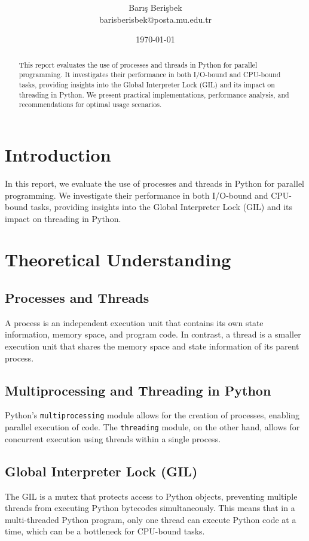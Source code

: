 \documentclass[onecolumn]{article}
\title{\spacecaps{Assignment Report :Evaluating the Optimal Use of Processes versus Threads in Python Parallel Programming}\\ \normalsize \spacesc{CENG 2034, Operating Systems} }
\author{Barış Berişbek\\barisberisbek@posta.mu.edu.tr}
\date{\today}
\begin{document}
\maketitle

\begin{abstract}
This report evaluates the use of processes and threads in Python for parallel programming. It investigates their performance in both I/O-bound and CPU-bound tasks, providing insights into the Global Interpreter Lock (GIL) and its impact on threading in Python. We present practical implementations, performance analysis, and recommendations for optimal usage scenarios.
\end{abstract}

\section{Introduction}
In this report, we evaluate the use of processes and threads in Python for parallel programming. We investigate their performance in both I/O-bound and CPU-bound tasks, providing insights into the Global Interpreter Lock (GIL) and its impact on threading in Python.

\section{Theoretical Understanding}
\subsection{Processes and Threads}
A process is an independent execution unit that contains its own state information, memory space, and program code. In contrast, a thread is a smaller execution unit that shares the memory space and state information of its parent process.

\subsection{Multiprocessing and Threading in Python}
Python's \texttt{multiprocessing} module allows for the creation of processes, enabling parallel execution of code. The \texttt{threading} module, on the other hand, allows for concurrent execution using threads within a single process.

\subsection{Global Interpreter Lock (GIL)}
The GIL is a mutex that protects access to Python objects, preventing multiple threads from executing Python bytecodes simultaneously. This means that in a multi-threaded Python program, only one thread can execute Python code at a time, which can be a bottleneck for CPU-bound tasks.
\end{document}
